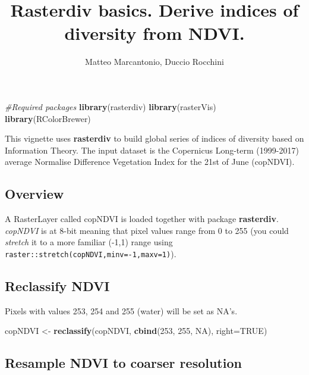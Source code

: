 \documentclass[
]{article}
\title{Rasterdiv basics. Derive indices of diversity from NDVI.}
\author{Matteo Marcantonio, Duccio Rocchini}
\date{}
\newenvironment{Shaded}{\begin{snugshade}}{\end{snugshade}}
\newcommand{\CommentTok}[1]{\textcolor[rgb]{0.56,0.35,0.01}{\textit{#1}}}
\newcommand{\DataTypeTok}[1]{\textcolor[rgb]{0.13,0.29,0.53}{#1}}
\newcommand{\DecValTok}[1]{\textcolor[rgb]{0.00,0.00,0.81}{#1}}
\newcommand{\KeywordTok}[1]{\textcolor[rgb]{0.13,0.29,0.53}{\textbf{#1}}}
\newcommand{\NormalTok}[1]{#1}
\newcommand{\OtherTok}[1]{\textcolor[rgb]{0.56,0.35,0.01}{#1}}
\newcommand{\StringTok}[1]{\textcolor[rgb]{0.31,0.60,0.02}{#1}}
\begin{document}
\maketitle

\begin{Shaded}
\begin{Highlighting}[]
\CommentTok{#Required packages}
\KeywordTok{library}\NormalTok{(rasterdiv)}
\KeywordTok{library}\NormalTok{(rasterVis)}
\KeywordTok{library}\NormalTok{(RColorBrewer)}
\end{Highlighting}
\end{Shaded}

This vignette uses \textbf{rasterdiv} to build global series of indices
of diversity based on Information Theory. The input dataset is the
Copernicus Long-term (1999-2017) average Normalise Difference Vegetation
Index for the 21st of June (copNDVI).

\hypertarget{overview}{%
\subsection{Overview}\label{overview}}

A RasterLayer called copNDVI is loaded together with package
\textbf{rasterdiv}. \emph{copNDVI} is at 8-bit meaning that pixel values
range from 0 to 255 (you could \emph{stretch} it to a more familiar
(-1,1) range using \texttt{raster::stretch(copNDVI,minv=-1,maxv=1)}).

\hypertarget{reclassify-ndvi}{%
\subsection{Reclassify NDVI}\label{reclassify-ndvi}}

Pixels with values 253, 254 and 255 (water) will be set as NA's.

\begin{Shaded}
\begin{Highlighting}[]
\NormalTok{copNDVI <-}\StringTok{ }\KeywordTok{reclassify}\NormalTok{(copNDVI, }\KeywordTok{cbind}\NormalTok{(}\DecValTok{253}\NormalTok{, }\DecValTok{255}\NormalTok{, }\OtherTok{NA}\NormalTok{), }\DataTypeTok{right=}\OtherTok{TRUE}\NormalTok{)}
\end{Highlighting}
\end{Shaded}

\hypertarget{resample-ndvi-to-coarser-resolution}{%
\subsection{Resample NDVI to coarser
resolution}\label{resample-ndvi-to-coarser-resolution}}
\end{document}
